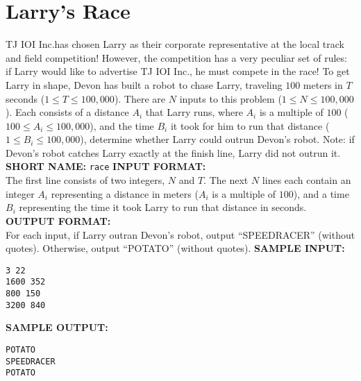 \section{Larry's Race}

TJ IOI Inc.\@ has chosen Larry as their corporate representative at the local track and field competition! However, the competition has a very peculiar set of rules: if Larry would like to advertise TJ IOI Inc., he must compete in the race! To get Larry in shape, Devon has built a robot to chase Larry, traveling $ 100 $ meters in $ T $ seconds ($ 1 \leq T \leq 100,000 $).
\blank
There are $ N $ inputs to this problem ($ 1 \leq N \leq 100,000 $). Each consists of a distance $ A_i $ that Larry runs, where $ A_i $ is a multiple of $ 100 $ ($ 100 \leq A_i \leq 100,000 $), and the time $ B_i $ it took for him to run that distance ($ 1 \leq B_i \leq 100,000 $), determine whether Larry could outrun Devon's robot.
\blank
\noindent Note: if Devon's robot catches Larry exactly at the finish line, Larry did not outrun it.
\blank
\textbf{SHORT NAME:} \verb|race|
\blank
\textbf{INPUT FORMAT:}\\
The first line consists of two integers, $ N $ and $ T $.
The next $ N $ lines each contain an integer $ A_i $ representing a distance in meters ($ A_i $ is a multiple of $ 100 $), and a time $ B_i $ representing the time it took Larry to run that distance in seconds.
\blank
\textbf{OUTPUT FORMAT:}\\
For each input, if Larry outran Devon's robot, output ``SPEEDRACER'' (without quotes). Otherwise, output ``POTATO'' (without quotes).
\blank
\textbf{SAMPLE INPUT:}
\begin{verbatim}
3 22
1600 352
800 150
3200 840
\end{verbatim}
\textbf{SAMPLE OUTPUT:}
\begin{verbatim}
POTATO
SPEEDRACER
POTATO
\end{verbatim}
